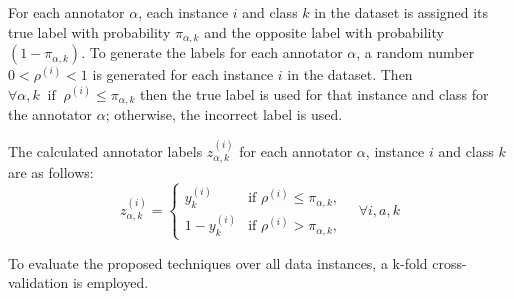For each annotator $\alpha $, each instance $i $ and class $k $ in the dataset is assigned its true label with probability $\pi_{\alpha,k} $ and the opposite label with probability $ (1-\pi_{\alpha,k}) $. To generate the labels for each annotator $\alpha $, a random number $0 < \rho^{(i)} < 1 $ is generated for each instance $i $ in the dataset. Then $\forall \alpha,k \; \; \text{if} \; \; \rho^{(i)}\leq \pi_{\alpha,k} $ then the true label is used for that instance and class for the annotator $\alpha $; otherwise, the incorrect label is used.

The calculated annotator labels $z_{\alpha,k}^{(i)} $ for each annotator $\alpha $, instance $i $ and class $k $ are as follows:
\begin{equation}
    z_{\alpha,k}^{(i)} =
    \begin{cases}
        y_k^{(i)} & \text{if } \rho^{(i)}  \leq \pi_{\alpha,k}, \\
        1 - y_k^{(i)} & \text{if } \rho^{(i)} > \pi_{\alpha,k},
    \end{cases} \quad \forall i, a, k
    \label{eq:crowd.eq.4.fictitious_label}
\end{equation}

To evaluate the proposed techniques over all data instances, a k-fold cross-validation is employed.
